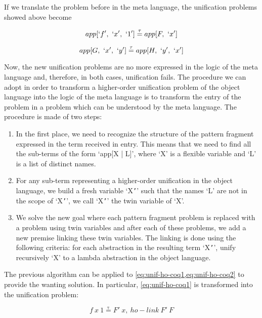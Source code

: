 \documentclass[acmengage]{acmart}
\newcommand*{\eqtau}{\ensuremath{\mathrel{\overset{\mathrm{\tau}}{=}}}}
\begin{document}
If we translate the problem before in the meta language, the unification
problems showed above become

\begin{equation}
  app[`f',\ `x',\ `1'] \eqtau app[F,\ `x']
  \label{eq:unif-ho-elpi1}
\end{equation}

\begin{equation}
  app[G,\ `x',\ `y'] \eqtau app[H,\ `y',\ `x']
  \label{eq:unif-ho-elpi2}
\end{equation}

Now, the new unification problems are no more expressed in the logic of the
meta language and, therefore, in both cases, unification fails. The
procedure we can adopt in order to transform a higher-order unification problem
of the object language into the logic of the meta language is to transform
the entry of the problem in a problem which can be understood by the meta
language. The procedure is made of two steps:

\begin{enumerate}
  \item In the first place, we need to recognize the structure of the pattern
        fragment expressed in the term received in entry. This means that we
        need to find all the sub-terms of the form `app[X | L]', where `X' is
        a flexible variable and `L' is a list of distinct names.
  \item For any sub-term representing a higher-order unification in the object 
        language, we build a fresh variable `X\texttt{'}' such that the names 
        `L' are not in the scope of `X\texttt{'}', we call `X\texttt{'}' the 
        twin variable of `X'.
  \item We solve the new goal where each pattern fragment problem is replaced
        with a problem using twin variables and after each of these problems, we
        add a new premise linking these twin variables. The linking is done
        using the following criteria: for each abstraction in the resulting term
        `X\texttt{'}', unify recursively `X' to a lambda abstraction in the
        object language.
\end{enumerate}

The previous algorithm can be applied to \cref{eq:unif-ho-coq1,eq:unif-ho-coq2}
to provide the wanting solution. In particular, \cref{eq:unif-ho-coq1} is
transformed into the unification problem:

\begin{equation}
  f\ x\ 1 \eqtau F'\ x,\ ho-link\ F'\ F
  \label{eq:unif-ho-elpi1'}
\end{equation}
\end{document}
